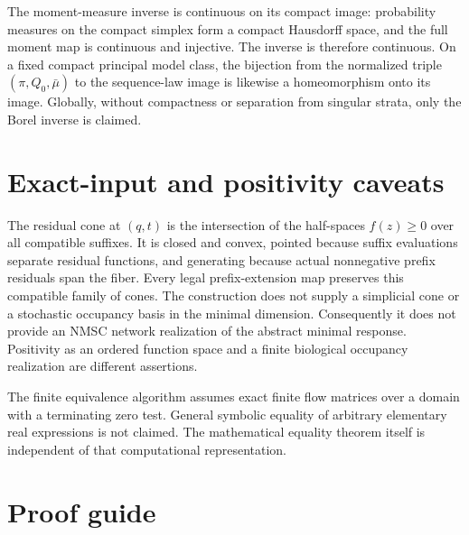 \documentclass[11pt]{article}
\begin{document}
The moment-measure inverse is continuous on its compact image: probability measures on the compact simplex form a compact Hausdorff space, and the full moment map is continuous and injective.  The inverse is therefore continuous.  On a fixed compact principal model class, the bijection from the normalized triple $(\pi,Q_0,\bar\mu)$ to the sequence-law image is likewise a homeomorphism onto its image.  Globally, without compactness or separation from singular strata, only the Borel inverse is claimed.

\section{Exact-input and positivity caveats}

The residual cone at $(q,t)$ is the intersection of the half-spaces $f(z)\ge0$ over all compatible suffixes.  It is closed and convex, pointed because suffix evaluations separate residual functions, and generating because actual nonnegative prefix residuals span the fiber.  Every legal prefix-extension map preserves this compatible family of cones.  The construction does not supply a simplicial cone or a stochastic occupancy basis in the minimal dimension.  Consequently it does not provide an NMSC network realization of the abstract minimal response.  Positivity as an ordered function space and a finite biological occupancy realization are different assertions.

The finite equivalence algorithm assumes exact finite flow matrices over a domain with a terminating zero test.  General symbolic equality of arbitrary elementary real expressions is not claimed.  The mathematical equality theorem itself is independent of that computational representation.

\section{Proof guide}
\end{document}
